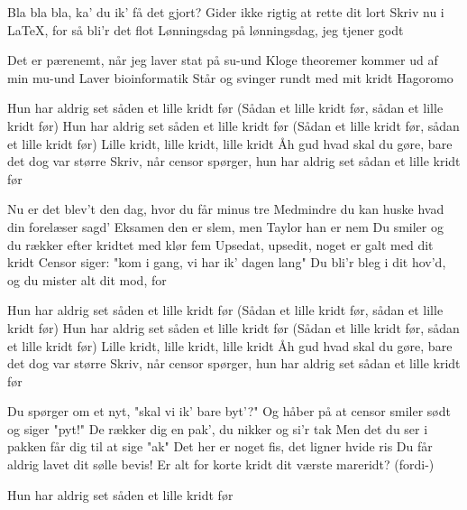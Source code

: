 \documentclass[a4paper,11pt]{article}
\begin{document}
\begin{song}
 Bla bla bla, ka’ du ik’ få det gjort?
Gider ikke rigtig at rette dit lort
Skriv nu i LaTeX, for så bli’r det flot
Lønningsdag på lønningsdag, jeg tjener godt

Det er pærenemt, når jeg laver stat på su-und
Kloge theoremer kommer ud af min mu-und
Laver bioinformatik
Står og svinger rundt med mit kridt
Hagoromo

  Hun har aldrig set såden et lille kridt før
(Sådan et lille kridt før, sådan et lille kridt før)
Hun har aldrig set såden et lille kridt før
(Sådan et lille kridt før, sådan et lille kridt før)
Lille kridt, lille kridt, lille kridt
Åh gud hvad skal du gøre, bare det dog var større
Skriv, når censor spørger, hun har aldrig set sådan et lille kridt før

      Nu er det blev't den dag, hvor du får minus tre
Medmindre du kan huske hvad din forelæser sagd'
Eksamen den er slem, men Taylor han er nem
Du smiler og du rækker efter kridtet med klør fem
Upsedat, upsedit, noget er galt med dit kridt
Censor siger: "kom i gang, vi har ik' dagen lang"
Du bli'r bleg i dit hov'd, og du mister alt dit mod, for

   Hun har aldrig set såden et lille kridt før
(Sådan et lille kridt før, sådan et lille kridt før)
Hun har aldrig set såden et lille kridt før
(Sådan et lille kridt før, sådan et lille kridt før)
Lille kridt, lille kridt, lille kridt
Åh gud hvad skal du gøre, bare det dog var større
Skriv, når censor spørger, hun har aldrig set sådan et lille kridt før

     Du spørger om et nyt, "skal vi ik' bare byt'?"
Og håber på at censor smiler sødt og siger "pyt!"
De rækker dig en pak', du nikker og si'r tak
Men det du ser i pakken får dig til at sige "ak"
Det her er noget fis, det ligner hvide ris
Du får aldrig lavet dit sølle bevis!
Er alt for korte kridt dit værste mareridt? (fordi-)

     Hun har aldrig set såden et lille kridt før

\end{song}
\end{document}
